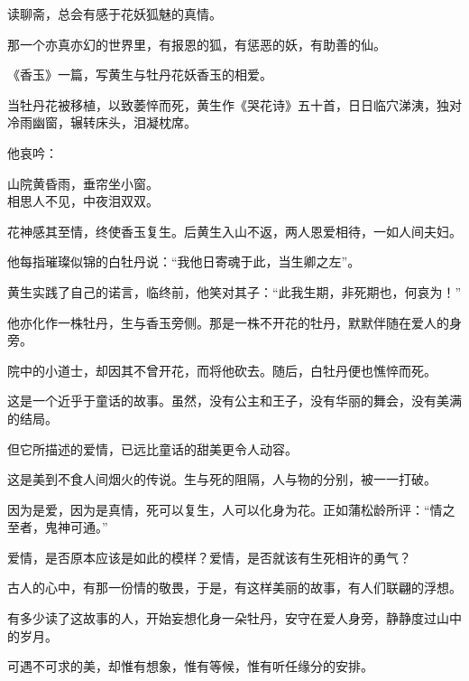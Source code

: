 \documentclass[12pt,a4paper]{article}
\def\blankrev{\vspace{1ex}}									%
\begin{document}
		\blankrev
		读聊斋，总会有感于花妖狐魅的真情。\par
		那一个亦真亦幻的世界里，有报恩的狐，有惩恶的妖，有助善的仙。

		《香玉》一篇，写黄生与牡丹花妖香玉的相爱。\par
		当牡丹花被移植，以致萎悴而死，黄生作《哭花诗》五十首，日日临穴涕洟，独对冷雨幽窗，辗转床头，泪凝枕席。\par
		他哀吟：

		\shortpoem{}{}{}
		山院黄昏雨，垂帘坐小窗。\\
		相思人不见，中夜泪双双。\\
		\endshortpoem

		花神感其至情，终使香玉复生。后黄生入山不返，两人恩爱相待，一如人间夫妇。\par
		他每指璀璨似锦的白牡丹说：“我他日寄魂于此，当生卿之左”。\par
		黄生实践了自己的诺言，临终前，他笑对其子：“此我生期，非死期也，何哀为！”\par
		他亦化作一株牡丹，生与香玉旁侧。那是一株不开花的牡丹，默默伴随在爱人的身旁。\par
		院中的小道士，却因其不曾开花，而将他砍去。随后，白牡丹便也憔悴而死。

		\blankrev
		这是一个近乎于童话的故事。虽然，没有公主和王子，没有华丽的舞会，没有美满的结局。\par
		但它所描述的爱情，已远比童话的甜美更令人动容。\par
		这是美到不食人间烟火的传说。生与死的阻隔，人与物的分别，被一一打破。\par
		因为是爱，因为是真情，死可以复生，人可以化身为花。正如蒲松龄所评：“情之至者，鬼神可通。”

		\blankrev
		爱情，是否原本应该是如此的模样？爱情，是否就该有生死相许的勇气？\par
		古人的心中，有那一份情的敬畏，于是，有这样美丽的故事，有人们联翩的浮想。\par
		有多少读了这故事的人，开始妄想化身一朵牡丹，安守在爱人身旁，静静度过山中的岁月。\par
		可遇不可求的美，却惟有想象，惟有等候，惟有听任缘分的安排。
\end{document}
